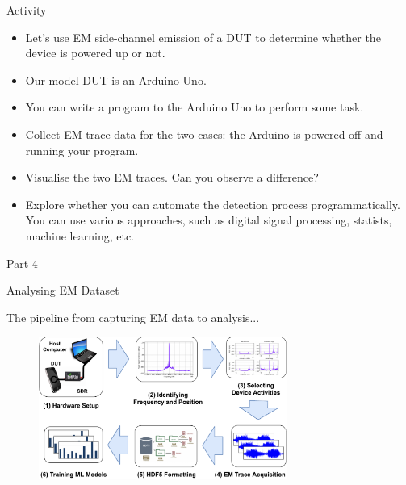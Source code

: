 \documentclass[handout]{beamer}
\begin{document}
\begin{frame}{Activity}  

\begin{itemize}
\footnotesize
	\item Let's use EM side-channel emission of a DUT to determine whether the device is powered up or not.
		\vspace{10pt}
	\item Our model DUT is an Arduino Uno.
		\vspace{10pt}
	\item You can write a program to the Arduino Uno to perform some task.
		\vspace{10pt}
	\item Collect EM trace data for the two cases: the Arduino is powered off and running your program.
		\vspace{10pt}
	\item Visualise the two EM traces. Can you observe a difference?
		\vspace{10pt}
	\item Explore whether you can automate the detection process programmatically. You can use various approaches, such as digital signal processing, statists, machine learning, etc.
\end{itemize}

\end{frame}



\begin{frame}{}  

	\begin{block}{Part 4}
	\end{block}

\end{frame}

\begin{frame}{Analysing EM Dataset}  

\footnotesize
The pipeline from capturing EM data to analysis...

	\begin{figure}
		\includegraphics[width=230pt]{figures/sdr-data-pipeline-V2.pdf}
	\end{figure}

\end{frame}
\end{document}

